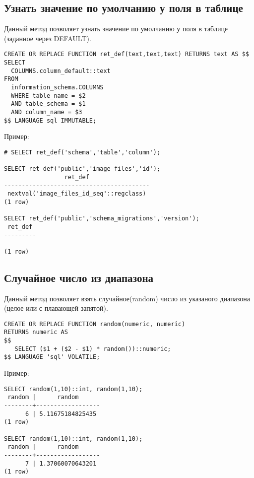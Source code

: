 \subsection{Узнать значение по умолчанию у поля в таблице}
Данный метод позволяет узнать значение по умолчанию у поля в таблице (заданное через DEFAULT).

\begin{lstlisting}[label=lst:snippets6,title=snippets/default\_value.sql]
CREATE OR REPLACE FUNCTION ret_def(text,text,text) RETURNS text AS $$
SELECT 
  COLUMNS.column_default::text
FROM 
  information_schema.COLUMNS
  WHERE table_name = $2
  AND table_schema = $1
  AND column_name = $3
$$ LANGUAGE sql IMMUTABLE;
\end{lstlisting}

Пример:
\begin{lstlisting}[label=lst:snippets7,caption=Узнать значение по умолчанию у поля в таблице. Пример]
# SELECT ret_def('schema','table','column');

SELECT ret_def('public','image_files','id');
                 ret_def                 
-----------------------------------------
 nextval('image_files_id_seq'::regclass)
(1 row)

SELECT ret_def('public','schema_migrations','version');
 ret_def 
---------
 
(1 row)
\end{lstlisting}

\subsection{Случайное число из диапазона}
Данный метод позволяет взять случайное(random) число из указаного диапазона (целое или с плавающей запятой).

\begin{lstlisting}[label=lst:snippets8,title=snippets/random\_from\_range.sql]
CREATE OR REPLACE FUNCTION random(numeric, numeric)
RETURNS numeric AS
$$
   SELECT ($1 + ($2 - $1) * random())::numeric;
$$ LANGUAGE 'sql' VOLATILE;
\end{lstlisting}

Пример:
\begin{lstlisting}[label=lst:snippets9,caption=Случайное число из диапазона. Пример]
SELECT random(1,10)::int, random(1,10);
 random |      random      
--------+------------------
      6 | 5.11675184825435
(1 row)

SELECT random(1,10)::int, random(1,10);
 random |      random      
--------+------------------
      7 | 1.37060070643201
(1 row)
\end{lstlisting}

